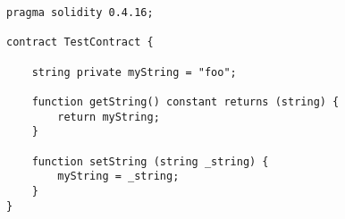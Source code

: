 

\begin{lstlisting}[language=Solidity]
pragma solidity 0.4.16;

contract TestContract {
    
	string private myString = "foo";
	
	function getString() constant returns (string) {
	    return myString;
	}
	
	function setString (string _string) {
	    myString = _string;
	}
}
\end{lstlisting}